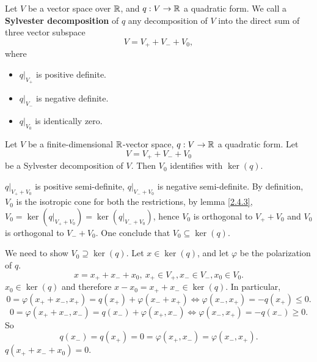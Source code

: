 \begin{definitionenv}
    Let $V$ be a vector space over $\mathbb{R}$, and $q: V\rightarrow \mathbb{R}$ a quadratic form.
    We call a \textbf{Sylvester decomposition} of $q$ any decomposition of $V$ into the direct sum of three vector subspace
    $$ V = V_+ + V_- +V_0,$$
    where
    \begin{itemize}
        \item $q|_{V_+}$ is positive definite.
        \item $q|_{V_-}$ is negative definite.
        \item $q|_{V_0}$ is identically zero.
    \end{itemize}
\end{definitionenv}
\begin{propositionenv}
    Let $V$ be a finite-dimensional $\mathbb{R}$-vector space, $q: V\rightarrow \mathbb{R}$ a quadratic form.
    Let 
    $$ V = V_+ + V_- + V_0$$
    be a Sylvester decomposition of $V$. Then $V_0$ identifies with $\ker(q)$.
\end{propositionenv}
\begin{proofenv}
    $q|_{V_+ + V_0}$ is positive semi-definite, $q|_{V_- + V_0}$ is negative semi-definite.
    By definition, $V_0$ is the isotropic cone for both the restrictions, by lemma \ref{2.4.3}, $V_0 = \ker \left(q|_{V_+ + V_0}\right) = \ker\left(q|_{V_-+V_0}\right)$, hence $V_0$ is orthogonal to $V_+ + V_0$ and $V_0$ is orthogonal to $V_- + V_0$.
    One conclude that $V_0\subseteq \ker (q)$.

    \quad We need to show $V_0 \supseteq \ker(q)$.
    Let $x \in \ker(q)$, and let $\varphi$ be the polarization of $q$.
    $$ x = x_+ +x_- + x_0,\ x_+ \in V_+, x_- \in V_-, x_0\in V_0.$$
    $x_0 \in \ker(q)$ and therefore $x - x_0 = x_+ + x_- \in \ker(q)$.
    In particular,
    $$ 0 = \varphi(x_+ +x_- ,x_+) = q(x_+) + \varphi(x_- + x_+) \Leftrightarrow \varphi (x_-,x_+) = -q(x_+) \le 0.$$
    $$ 0 = \varphi(x_+ + x_-,x_-) = q(x_-) + \varphi(x_+,x_-) \Leftrightarrow \varphi(x_-, x_+) = -q(x_-) \ge 0.$$
    So 
    $$ q(x_-) = q(x_+)= 0 =\varphi(x_+,x_-) = \varphi(x_-,x_+).$$
    $q(x_+ +x_- +x_0) = 0.$
\end{proofenv}


